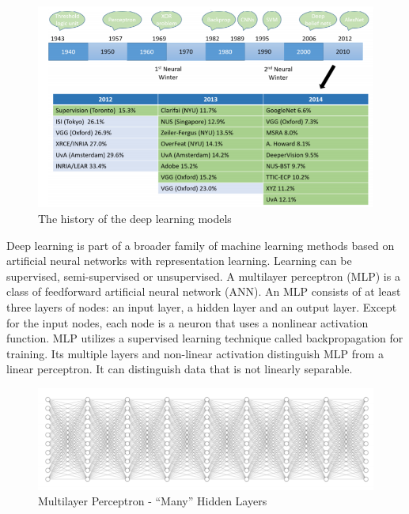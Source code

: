 \begin{figure}
    \centering
    \includegraphics[scale=0.5]{images/chapter8/deeplearning.PNG}
    \caption{The history of the deep learning models}
    \label{fig:deeplearning}
\end{figure}

Deep learning is part of a broader family of machine learning methods based on artificial neural networks with representation learning. Learning can be supervised, semi-supervised or unsupervised.
\newline
A multilayer perceptron (MLP) is a class of feedforward artificial neural network (ANN). An MLP consists of at least three layers of nodes: an input layer, a hidden layer and an output layer. Except for the input nodes, each node is a neuron that uses a nonlinear activation function. MLP utilizes a supervised learning technique called backpropagation for training. Its multiple layers and non-linear activation distinguish MLP from a linear perceptron. It can distinguish data that is not linearly separable.

\begin{figure}
    \centering
    \includegraphics[scale=0.5]{images/chapter8/many_layers.PNG}
    \caption{Multilayer Perceptron - “Many” Hidden Layers}
\end{figure}

